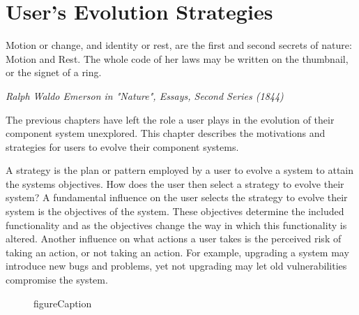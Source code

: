 \chapter{User's Evolution Strategies}
\label{strategies}
\epigraph{Motion or change, and identity or rest, are the first and second secrets of nature: Motion and Rest. 
The whole code of her laws may be written on the thumbnail, or the signet of a ring.}
{\textit{Ralph Waldo Emerson in "Nature", Essays, Second Series (1844)}}
The previous chapters have left the role a user plays in the evolution of their component system unexplored.
This chapter describes the motivations and strategies for users to evolve their component systems.


A strategy is the plan or pattern employed by a user to evolve a system to attain the systems objectives.
How does the user then select a strategy to evolve their system?
A fundamental influence on the user selects the strategy to evolve their system is the objectives of the system.
These objectives determine the included functionality and as the objectives change the way in which this functionality is altered.  
Another influence on what actions a user takes is the perceived risk of taking an action, or not taking an action.
For example, upgrading a system may introduce new bugs and problems, yet not upgrading may let old vulnerabilities compromise the system.

\begin{figure}[htp]
\begin{center}
  \caption[labelInTOC]{figureCaption}
  \label{impl.criteriamapping}
\end{center}
\end{figure}

